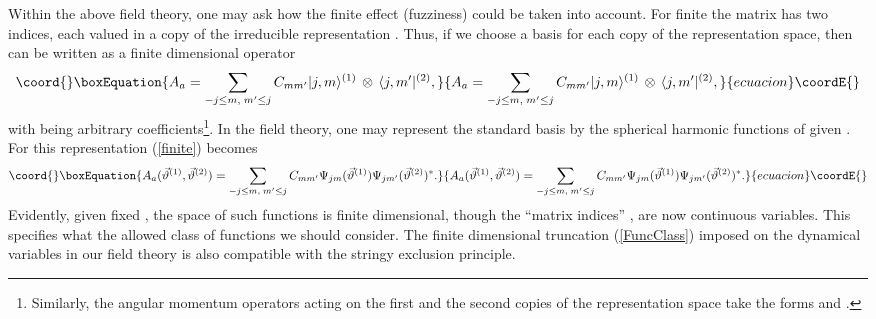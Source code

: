 \documentclass[a4paper,12pt]{article}
\begin{document}
Within the above field theory, one may ask how the finite \coordHE{} effect (fuzziness) could be taken into account. For finite \coordHE{} the matrix \coordHE{} has two indices, each valued in a copy of the irreducible representation \coordHE{}. Thus, if we choose a basis \coordHE{} for each copy of the representation space, then \coordHE{} can be written as a finite dimensional operator
\begin{equation}\coord{}\boxEquation{
A_{a}=\sum_{-j\leq m,\;m'\leq j}C_{mm'}|j,m\rangle^{(1)}\,\otimes\,\langle j,m'|^{(2)},
\label{finite}
}{
A_{a}=\sum_{-j\leq m,\;m'\leq j}C_{mm'}|j,m\rangle^{(1)}\,\otimes\,\langle j,m'|^{(2)},
}{ecuacion}\coordE{}\end{equation}
with \coordHE{} being arbitrary coefficients\footnote{Similarly, the angular momentum operators \coordHE{} acting on the first and the second copies of the representation space take the forms \coordHE{} and \coordHE{}.}. In the field theory, one may represent the standard basis \coordHE{} by the spherical harmonic functions \coordHE{} of given \coordHE{}. For this representation (\ref{finite}) becomes
\begin{equation}\coord{}\boxEquation{
A_{a}(\vec{\vartheta}^{(1)},\vec{\vartheta}^{(2)})=\sum_{-j\leq m,\;m'\leq j}C_{mm'}\Psi_{jm}(\vec{\vartheta}^{(1)})\Psi_{jm'}(\vec{\vartheta}^{(2)})^{*}.
\label{FuncClass}
}{
A_{a}(\vec{\vartheta}^{(1)},\vec{\vartheta}^{(2)})=\sum_{-j\leq m,\;m'\leq j}C_{mm'}\Psi_{jm}(\vec{\vartheta}^{(1)})\Psi_{jm'}(\vec{\vartheta}^{(2)})^{*}.
}{ecuacion}\coordE{}\end{equation}
Evidently, given fixed \coordHE{}, the space of such functions is finite dimensional, though the ``matrix indices'' \coordHE{}, \coordHE{} are now continuous variables. This specifies what the allowed class of functions we should consider. The finite dimensional truncation (\ref{FuncClass}) imposed on the dynamical variables in our field theory is also compatible with the stringy exclusion principle.
\end{document}
